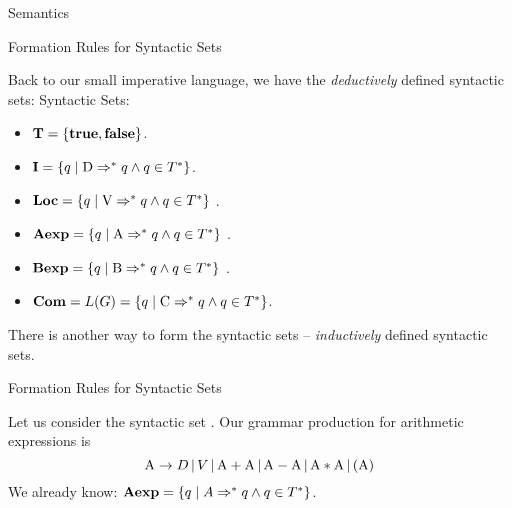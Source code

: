 \documentclass{beamer}
\begin{document}
\begin{frame}{Semantics}

\begin{frame}{Formation Rules for Syntactic Sets}
\small

Back to our small imperative language, we have the {\em deductively} defined syntactic sets:
Syntactic Sets:
\begin{itemize}
\item $\mbox{\bf T} = \{  \mbox{\bf true} ,\mbox{\bf false} \}$.
\item $\mbox{\bf I} = \{ q \mid \mbox{D} \Rightarrow^* q \wedge q \in T^*\}$.
\item $\mbox{\bf Loc} = \{ q \mid \mbox{V} \Rightarrow^* q \wedge q \in T^*\}$ .
\item $\mbox{\bf Aexp} = \{ q \mid \mbox{A} \Rightarrow^* q \wedge q \in T^*\}$ .
\item $\mbox{\bf Bexp} = \{ q \mid \mbox{B} \Rightarrow^* q \wedge q \in T^*\}$ .
\item $\mbox{\bf Com} = L(G) = \{ q \mid \mbox{C} \Rightarrow^* q \wedge q \in T^*\}$.
\end{itemize}

There is another way to form the syntactic sets -- {\em inductively} defined syntactic sets.

\end{frame}


\begin{frame}{Formation Rules for Syntactic Sets}
\scriptsize

Let us consider the syntactic set .  Our grammar production for arithmetic expressions is
\[
\mbox{A} \rightarrow D \,|\, V \,|\, \mbox{A} +\mbox{A} \,|\, \mbox{A} - \mbox{A} \,|\,
	\mbox{A} * \mbox{A}\,|\, ( \mbox{A} )
\]
We already know: $\mbox{\bf Aexp} = \{ q \mid A \Rightarrow^* q \wedge q \in T^*\}$.


\end{frame}
\end{frame}
\end{document}
